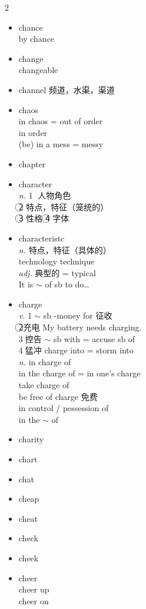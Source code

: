 \documentclass[../../book.tex]{subfiles}
\begin{document}
\begin{multicols}{2}
\begin{itemize}
\item[-] chance
\\by chance
\item[-] change
\\changeable
\item[-] channel 频道，水渠，渠道
\item[-] chaos
\\in chaos = out of order
\\in order
\\(be) in a mess = messy
\item[-] chapter
\item[-] character
\\\emph{n.} \textcircled{1} 人物角色
\\\textcircled{2} 特点，特征（笼统的）
\\\textcircled{3} 性格 \textcircled{4} 字体
\item[-] characteristc
\\\emph{n.} 特点，特征（具体的）
\\ {\color{violet}technology technique}
\\\emph{adj.} 典型的 = typical
\\It is $\sim$ of sb to do\ldots
\item[-] charge
\\\emph{v.} \textcircled{1}$\sim$ sb -money for 征收
\\\textcircled{2}充电 My battery needs charging.
\\\textcircled{3}控告 $\sim$ sb with = accuse sb of
\\\textcircled{4}猛冲 charge into = storm into
\\\emph{n.} in charge of
\\in the charge of = in one\textquoteright s charge
\\take charge of
\\be free of charge 免费
\\{\color{violet}in control / pessession of\\in the $\sim$ of}
\item[-] charity
\item[-] chart
\item[-] chat
\item[-] cheap
\item[-] cheat
\item[-] check
\item[-] cheek
\item[-] cheer
\\cheer up
\\cheer on

\end{itemize}
\end{multicols}
\end{document}
